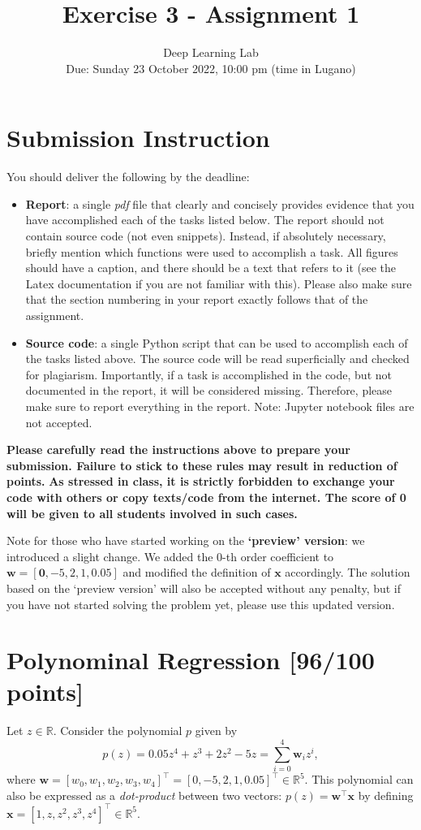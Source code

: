 \documentclass[a4paper,11pt]{article}
\title{Exercise 3 - \textbf{Assignment 1}}
\author{Deep Learning Lab\\
Due: Sunday 23 October 2022, 10:00 pm (time in Lugano)}
\begin{document}
\maketitle

\section*{Submission Instruction}
You should deliver the following by the deadline:
\begin{itemize}
 \item \textbf{Report}: a single \emph{pdf} file that clearly and concisely provides evidence that you have accomplished each of the tasks listed below. The report should not contain source code (not even snippets). Instead, if absolutely necessary, briefly mention which functions were used to accomplish a task. All figures should have a caption, and there should be a text that refers to it (see the Latex documentation if you are not familiar with this). Please also make sure that the section numbering in your report exactly follows that of the assignment.
 \item \textbf{Source code}: a single Python script that can be used to accomplish each of the tasks listed above.  The source code will be read superficially and checked for plagiarism.
 Importantly, if a task is accomplished in the code, but not documented in the report, it will be considered missing. Therefore, please make sure to report everything in the report. Note: Jupyter notebook files are not accepted.
\end{itemize}
\textbf{Please carefully read the instructions above to prepare your submission.
Failure to stick to these rules may result in reduction of points.}
\textbf{As stressed in class, it is strictly forbidden to exchange your code with others or copy texts/code from the internet. The score of 0 will be given to all students involved in such cases.}

Note for those who have started working on the \textbf{`preview' version}: we introduced a slight change. We added the 0-th order coefficient to $\mathbf{w} = [\textbf{0}, -5, 2, 1, 0.05]$ and modified the definition of $\mathbf{x}$ accordingly. The solution based on the `preview version' will also be accepted without any penalty, but if you have not started solving the problem yet, please use this updated version.

\section{Polynominal Regression [96/100 points]}
Let $z \in \mathbb{R}$. Consider the polynomial $p$ given by 
\begin{equation*}
    p(z) = 0.05z^4 + z^3 + 2z^2 -5z = \sum_{i = 0}^4 \mathbf{w}_i z^{i},
\end{equation*}
where $\mathbf{w} = [w_0, w_1, w_2, w_3, w_4]^\intercal = [0, -5, 2, 1, 0.05]^\intercal \in \mathbb{R}^5$. This polynomial can also be expressed as a \textit{dot-product} between two vectors: $p(z) = \mathbf{w}^\intercal \mathbf{x}$ by defining $\mathbf{x} = [1, z, z^2, z^3, z^4]^\intercal \in \mathbb{R}^5$.
\end{document}
